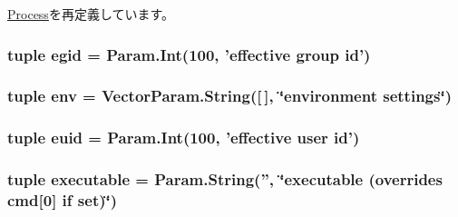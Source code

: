 \hyperlink{classProcess_1_1Process_a17da7064bc5c518791f0c891eff05fda}{Process}を再定義しています。\hypertarget{classProcess_1_1LiveProcess_ab9c18042878b79c81ce003cfca764ddb}{
\subsubsection[{egid}]{\setlength{\rightskip}{0pt plus 5cm}tuple {\bf egid} = Param.Int(100, 'effective group id')}}
\label{classProcess_1_1LiveProcess_ab9c18042878b79c81ce003cfca764ddb}
\hypertarget{classProcess_1_1LiveProcess_a8618073d5c1938c3c6d5ae0e34489f49}{
\subsubsection[{env}]{\setlength{\rightskip}{0pt plus 5cm}tuple {\bf env} = VectorParam.String(\mbox{[}$\,$\mbox{]}, \char`\"{}environment settings\char`\"{})}}
\label{classProcess_1_1LiveProcess_a8618073d5c1938c3c6d5ae0e34489f49}
\hypertarget{classProcess_1_1LiveProcess_a8c9f048007df8b6d47f351e056412af6}{
\subsubsection[{euid}]{\setlength{\rightskip}{0pt plus 5cm}tuple {\bf euid} = Param.Int(100, 'effective user id')}}
\label{classProcess_1_1LiveProcess_a8c9f048007df8b6d47f351e056412af6}
\hypertarget{classProcess_1_1LiveProcess_a1bc0ecd58c0cf2d4d931ef9b5028f86b}{
\subsubsection[{executable}]{\setlength{\rightskip}{0pt plus 5cm}tuple {\bf executable} = Param.String('', \char`\"{}executable (overrides {\bf cmd}\mbox{[}0\mbox{]} if set)\char`\"{})}}
